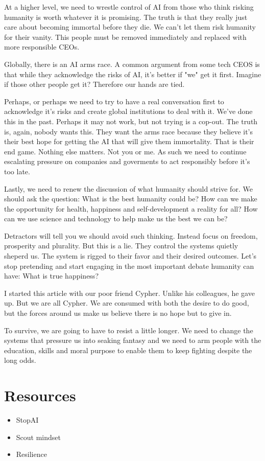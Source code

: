 \documentclass[11pt]{article}
\begin{document}
At a higher level, we need to wrestle control of AI from those who think risking humanity is worth whatever it is promising. The truth is that they really just care about becoming immortal before they die. We can't let them risk humanity for their vanity. This people must be removed immediately and replaced with more responsible CEOs.

Globally, there is an AI arms race. A common argument from some tech CEOS is that while they acknowledge the risks of AI, it's better if "we" get it first. Imagine if those other people get it? Therefore our hands are tied.

Perhaps, or perhaps we need to try to have a real conversation first to acknowledge it's risks and create global institutions to deal with it. We've done this in the past. Perhaps it may not work, but not trying is a cop-out. The truth is, again, nobody wants this. They want the arms race because they believe it's their best hope for getting the AI that will give them immortality. That is their end game. Nothing else matters. Not you or me. As such we need to continue escalating pressure on companies and goverments to act responsibly before it's too late. 

Lastly, we need to renew the discussion of what humanity should strive for. We should ask the question: What is the best humanity could be? How can we make the opportunity for health, happiness and self-development a reality for all? How can we use science and technology to help make us the best we can be?

Detractors will tell you we should avoid such thinking. Instead focus on freedom, prosperity and plurality. But this is a lie. They control the systems quietly sheperd us. The system is rigged to their favor and their desired outcomes. Let's stop pretending and start engaging in the most important debate humanity can have: What is true happiness?

I started this article with our poor friend Cypher. Unlike his colleagues, he gave up. But we are all Cypher. We are consumed with both the desire to do good, but the forces around us make us believe there is no hope but to give in.

To survive, we are going to have to resist a little longer. We need to change the systems that pressure us into seaking fantasy and we need to arm people with the education, skills and moral purpose to enable them to keep fighting despite the long odds.
\section{Resources}
\label{sec:org6fdfaf4}
\begin{itemize}
\item StopAI
\item Scout mindset
\item Resilience
\end{itemize}
\end{document}
